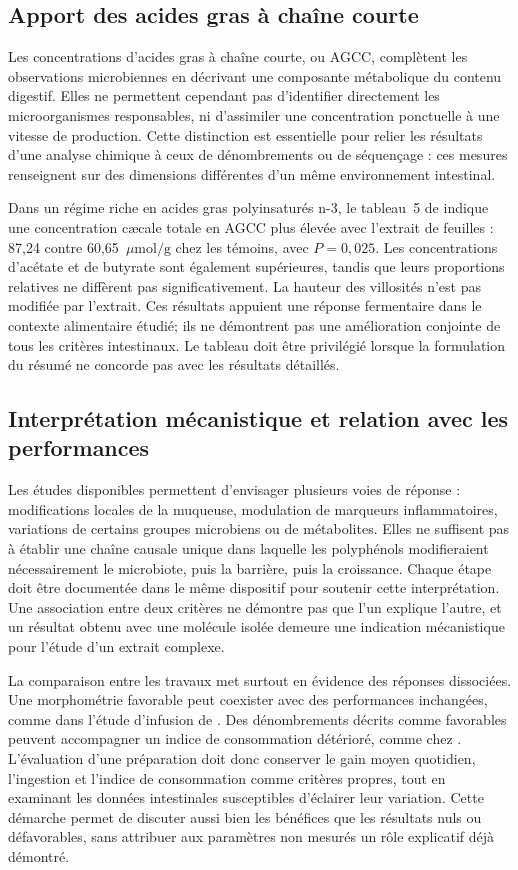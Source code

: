 \subsection{Apport des acides gras à chaîne courte}

Les concentrations d'acides gras à chaîne courte, ou AGCC, complètent les observations microbiennes en décrivant une composante métabolique du contenu digestif. Elles ne permettent cependant pas d'identifier directement les microorganismes responsables, ni d'assimiler une concentration ponctuelle à une vitesse de production. Cette distinction est essentielle pour relier les résultats d'une analyse chimique à ceux de dénombrements ou de séquençage : ces mesures renseignent sur des dimensions différentes d'un même environnement intestinal.

Dans un régime riche en acides gras polyinsaturés n-3, le tableau~5 de \citet{Pirman2021} indique une concentration cæcale totale en AGCC plus élevée avec l'extrait de feuilles : 87,24 contre 60,65~\(\mu\mathrm{mol}/\mathrm{g}\) chez les témoins, avec \(P=0{,}025\). Les concentrations d'acétate et de butyrate sont également supérieures, tandis que leurs proportions relatives ne diffèrent pas significativement. La hauteur des villosités n'est pas modifiée par l'extrait. Ces résultats appuient une réponse fermentaire dans le contexte alimentaire étudié; ils ne démontrent pas une amélioration conjointe de tous les critères intestinaux. Le tableau doit être privilégié lorsque la formulation du résumé ne concorde pas avec les résultats détaillés.

\subsection{Interprétation mécanistique et relation avec les performances}

Les études disponibles permettent d'envisager plusieurs voies de réponse : modifications locales de la muqueuse, modulation de marqueurs inflammatoires, variations de certains groupes microbiens ou de métabolites. Elles ne suffisent pas à établir une chaîne causale unique dans laquelle les polyphénols modifieraient nécessairement le microbiote, puis la barrière, puis la croissance. Chaque étape doit être documentée dans le même dispositif pour soutenir cette interprétation. Une association entre deux critères ne démontre pas que l'un explique l'autre, et un résultat obtenu avec une molécule isolée demeure une indication mécanistique pour l'étude d'un extrait complexe.

La comparaison entre les travaux met surtout en évidence des réponses dissociées. Une morphométrie favorable peut coexister avec des performances inchangées, comme dans l'étude d'infusion de \citet{Erener2023}. Des dénombrements décrits comme favorables peuvent accompagner un indice de consommation détérioré, comme chez \citet{Negm2025}. L'évaluation d'une préparation doit donc conserver le gain moyen quotidien, l'ingestion et l'indice de consommation comme critères propres, tout en examinant les données intestinales susceptibles d'éclairer leur variation. Cette démarche permet de discuter aussi bien les bénéfices que les résultats nuls ou défavorables, sans attribuer aux paramètres non mesurés un rôle explicatif déjà démontré.
